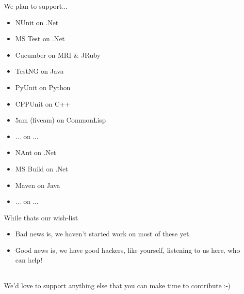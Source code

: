 \documentclass{beamer}
\begin{document}
\begin{frame}{We plan to support...}
  \begin{centering}
    \begin{multicols}{2}
      \begin{itemize}
      \item {\color{green}NUnit} on {\color{blue}.Net}
      \item {\color{green}MS Test} on {\color{blue}.Net}
      \item {\color{green}Cucumber} on {\color{blue}MRI \& JRuby}
      \item {\color{green}TestNG} on {\color{blue}Java}
      \item {\color{green}PyUnit} on {\color{blue}Python}
      \item {\color{green}CPPUnit} on {\color{blue} C++}
      \item {\color{green}5am (fiveam)} on {\color{blue} CommonLisp}
      \item {\color{green} ...} on {\color{blue} ...}
      \end{itemize}
      \begin{itemize}
      \item {\color{red}NAnt} on {\color{blue}.Net}
      \item {\color{red}MS Build} on {\color{blue}.Net}
      \item {\color{red}Maven} on {\color{blue}Java}
      \item {\color{red}...} on {\color{blue}...}
      \end{itemize}
    \end{multicols}
  \end{centering}
\end{frame}

\begin{frame}{While thats our wish-list}
  \begin{center}
    \begin{itemize}
    \item Bad news is, we haven't started work on most of these yet.\\
      \pause
    \item Good news is, we have good hackers, like yourself, listening to us here, who can help!
    \end{itemize}
    \pause
    \quad\\
    We'd love to support anything else that you can make time to contribute :-)
  \end{center}
\end{frame}
\end{document}
